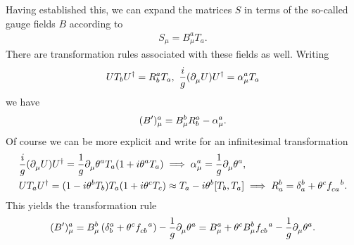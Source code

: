 Having established this, we can expand the matrices $S$ in terms of the so-called gauge fields $B$ according to
\begin{align*}
	S_{\mu} = B_{\mu}^{a}T_{a}.
\end{align*}
There are transformation rules associated with these fields as well. Writing
\begin{align*}
	UT_{b}U^{\dagger} = R_{b}^{a}T_{a},\ \frac{i}{g}(\partial^{}_{\mu}U)U^{\dagger} = \alpha^{a}_{\mu}T_{a}
\end{align*}
we have
\begin{align*}
	(B^{\prime})_{\mu}^{a} = B_{\mu}^{b}R_{b}^{a} - \alpha^{a}_{\mu}.
\end{align*}
Of course we can be more explicit and write for an infinitesimal transformation
\begin{align*}
	&\frac{i}{g}(\del{}{\mu}U)U\adj = \frac{1}{g}\del{}{\mu}\theta^{a}T_{a}(1 + i\theta^{a}T_{a}) \implies \alpha^{a}_{\mu} = \frac{1}{g}\del{}{\mu}\theta^{a}, \\
	&UT_{a}U\adj = (1 - i\theta^{b}T_{b})T_{a}(1 + i\theta^{c}T_{c}) \approx T_{a} - i\theta^{b}\comm{T_{b}}{T_{a}} \implies R_{a}^{b} = \kdelta{b}{a} + \theta^{c}\srconst{ca}{b}.
\end{align*}
This yields the transformation rule
\begin{align*}
	(B\p)_{\mu}^{a} = B_{\mu}^{b}\left(\kdelta{a}{b} + \theta^{c}\srconst{cb}{a}\right) - \frac{1}{g}\del{}{\mu}\theta^{a} = B_{\mu}^{a} + \theta^{c}B_{\mu}^{b}\srconst{cb}{a} - \frac{1}{g}\del{}{\mu}\theta^{a}.
\end{align*}

